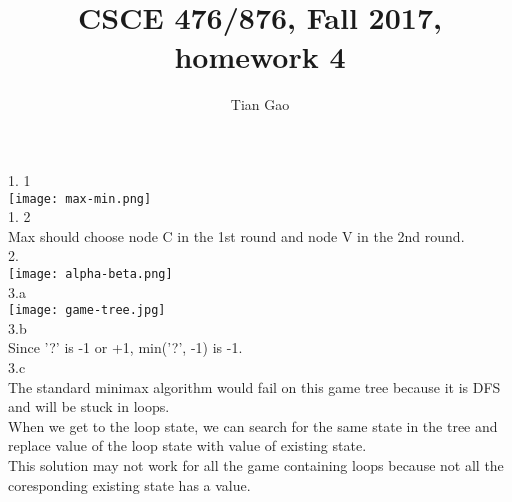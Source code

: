 \documentclass[a4paper]{article}
\title{CSCE 476/876, Fall 2017, homework 4}
\author{Tian Gao}
\begin{document}
\maketitle


1. 1\\
\texttt{[image: max-min.png]}\\
1. 2\\
Max should choose node C in the 1st round and node V in the 2nd round.\\

2.\\
\texttt{[image: alpha-beta.png]}\\

3.a\\
\texttt{[image: game-tree.jpg]}\\
3.b\\
Since '?' is -1 or +1, min('?', -1) is -1. \\
3.c\\
The standard minimax algorithm would fail on this game tree because it is DFS and will be stuck in loops.\\
When we get to the loop state, we can search for the same state in the tree and replace value of the loop state with value of existing state.\\
This solution may not work for all the game containing loops because not all the coresponding existing state has a value.\\
\end{document}
